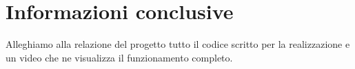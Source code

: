 \documentclass[a4paper,11pt]{report}
\begin{document}
\section{Informazioni conclusive}
Alleghiamo alla relazione del progetto tutto il codice scritto per la realizzazione e un video che ne visualizza il funzionamento completo.
\end{document}
